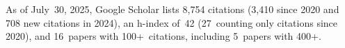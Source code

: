 %
As of July~30, 2025, Google Scholar lists
8,754 citations (3,410 since 2020 and 708 new citations in 2024),
an h-index of~42 (27~counting only citations since 2020),
and 16~papers with 100+~citations, including 5~papers with 400+.
